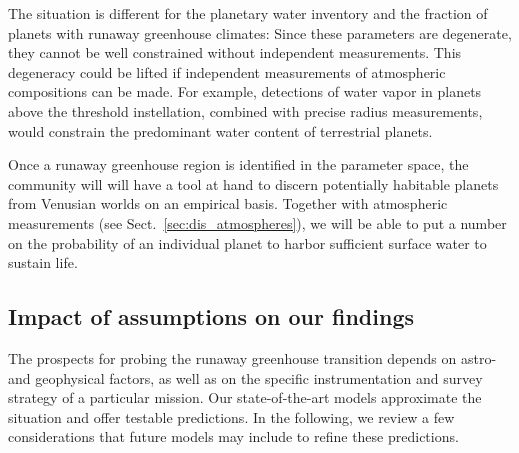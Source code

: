 \documentclass[twocolumn,twocolappendix]{aastex631}
\begin{document}
The situation is different for the planetary water inventory and the fraction of planets with runaway greenhouse climates:
Since these parameters are degenerate, they cannot be well constrained without independent measurements.
This degeneracy could be lifted if independent measurements of atmospheric compositions can be made.
For example, detections of water vapor in planets above the threshold instellation, combined with precise radius measurements, would constrain the predominant water content of terrestrial planets.

Once a runaway greenhouse region is identified in the parameter space, the community will will have a tool at hand to discern potentially habitable planets from Venusian worlds on an empirical basis.
Together with atmospheric measurements (see Sect.~\ref{sec:dis_atmospheres}), we will be able to put a number on the probability of an individual planet to harbor sufficient surface water to sustain life.


\subsection{Impact of assumptions on our findings}
The prospects for probing the runaway greenhouse transition depends on astro- and geophysical factors, as well as on the specific instrumentation and survey strategy of a particular mission.
Our state-of-the-art models approximate the situation and offer testable predictions.
In the following, we review a few considerations that future models may include to refine these predictions.
\end{document}
